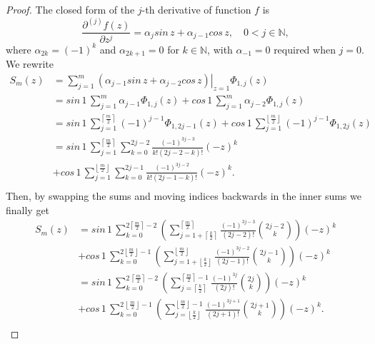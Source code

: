 \begin{proof}
The closed form of the $j$-th derivative of function $f$ is
$$\frac{\partial^{(j)}{f}(z)}{\partial{z}^{j}} = \alpha_{j}sin\,{z} +
\alpha_{j-1}cos\,{z}, \quad 0<j\in\mathbb{N},$$ where
$\alpha_{2k} = (-1)^{k}$ and $\alpha_{2k+1} = 0$ for $k\in\mathbb{N}$, with 
$\alpha_{-1}=0$ required when $j=0$. We rewrite
\begin{displaymath}
\begin{split}
  S_{m}(z) &= \sum_{j=1}^{m}{ \left. \left(\alpha_{j-1}sin\,{z} + \alpha_{j-2}cos\,{z}\right) \right|_{z=1}\Phi_{1,j}(z)} \\
       &= sin\,{1}\,\sum_{j=1}^{m}{ \alpha_{j-1}\Phi_{1,j}(z)} + cos\,{1}\,\sum_{j=1}^{m}{ \alpha_{j-2}\Phi_{1,j}(z)} \\
       &= sin\,{1}\,\sum_{j=1}^{\left\lceil \frac{m}{2} \right\rceil}{ (-1)^{j-1}\Phi_{1,2j-1}(z)} 
        + cos\,{1}\,\sum_{j=1}^{\left\lfloor \frac{m}{2} \right\rfloor}{ (-1)^{j-1}\Phi_{1,2j}(z)} \\
       &= sin\,{1}\,\sum_{j=1}^{\left\lceil \frac{m}{2} \right\rceil}{\sum_{k=0}^{2j-2}{ \frac{(-1)^{3j-3}}{k!(2j-2-k)!}{(-z)^{k}}} }\\
       &+ cos\,{1}\,\sum_{j=1}^{\left\lfloor \frac{m}{2} \right\rfloor}{\sum_{k=0}^{2j-1}{ \frac{(-1)^{3j-2}}{k!(2j-1-k)!}{(-z)^{k}}}}. \\
\end{split}
\end{displaymath}
Then, by swapping the sums and moving indices backwards in the inner sums we
finally get
\begin{displaymath}
\begin{split}
  S_{m}(z)  &= sin\,{1}\,\sum_{k=0}^{2 \left\lceil \frac{m}{2} \right\rceil-2}{\left(\sum_{j=1+\left\lceil \frac{k}{2}\right\rceil}^{\left\lceil \frac{m}{2} \right\rceil}{\frac{(-1)^{3j-3}}{(2j-2)!}{2j-2\choose k}}\right) {(-z)^{k}}}\\
            &+ cos\,{1}\,\sum_{k=0}^{2 \left\lfloor \frac{m}{2} \right\rfloor-1}{\left(\sum_{j=1+\left\lfloor \frac{k}{2}\right\rfloor}^{\left\lfloor \frac{m}{2} \right\rfloor}{ \frac{(-1)^{3j-2}}{(2j-1)!} {2j-1\choose k}}\right){(-z)^{k}}} \\
            &= sin\,{1}\,\sum_{k=0}^{2\,\left\lceil \frac{m}{2} \right\rceil-2}{\left(\sum_{j=\left\lceil \frac{k}{2}\right\rceil}^{\left\lceil \frac{m}{2} \right\rceil -1}{\frac{(-1)^{3j}}{(2j)!}{2j\choose k}}\right) {(-z)^{k}}}\\
            &+ cos\,{1}\,\sum_{k=0}^{2\,\left\lfloor \frac{m}{2} \right\rfloor-1}{\left(\sum_{j=\left\lfloor \frac{k}{2}\right\rfloor}^{\left\lfloor \frac{m}{2} \right\rfloor -1}{\frac{(-1)^{3j+1}}{(2j + 1)!} {2j+1\choose k}}\right){(-z)^{k}}}. \\
\end{split}
\end{displaymath}
\qedhere
\end{proof}

